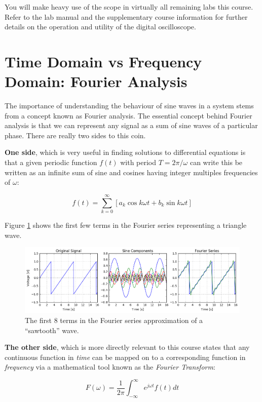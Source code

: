 \documentclass{tufte-book}
\begin{document}
You will make heavy use of the scope in virtually all remaining labs this course. Refer to the lab manual and the supplementary course information for further details on the operation and utility of the digital oscilloscope.

\section{Time Domain vs Frequency Domain: Fourier Analysis}\label{sec:fourier}
The importance of understanding the behaviour of sine waves in a system stems from a concept known as Fourier analysis. The essential concept behind Fourier analysis is that we can represent any signal as a sum of sine waves of a particular phase. There are really two sides to this coin. 

\textbf{One side}, which is very useful in finding solutions to differential equations is that a given periodic function $f(t)$ with period $T= 2\pi/\omega$ can write this be written as an infinite sum of sine and cosines having integer multiples frequencies of $\omega$:

$$
f(t) = \sum_{k=0}^\infty\left[a_k\cos k\omega t + b_k\sin k\omega t\right]
$$

\noindent Figure \ref{fig:FourierSeries} shows the first few terms in the Fourier series representing a triangle wave.

\begin{figure}[h]
\caption{The first 8 terms in the Fourier series approximation of a ``sawtooth'' wave.}
\label{fig:FourierSeries}
\begin{center}
\includegraphics[width=13cm]{FourierSeries.png}
\end{center}
\end{figure}

\textbf{The other side}, which is more directly relevant to this course states that any continuous function in \textit{time} can be mapped on to a corresponding function in \textit{frequency} via a mathematical tool known as the \textit{Fourier Transform}:

\begin{equation}\label{def:fouriertransform}
F(\omega) = \frac{1}{2\pi}\int_{-\infty}^{\infty}e^{j\omega t}f(t)dt
\end{equation}
\end{document}
